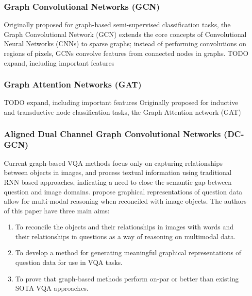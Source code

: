\subsubsection{Graph Convolutional Networks (GCN)}
Originally proposed for graph-based semi-supervised classification tasks, the Graph Convolutional Network (GCN) extends the core concepts of Convolutional Neural Networks (CNNs) to sparse graphs; instead of performing convolutions on regions of pixels, GCNs convolve features from connected nodes in graphs.
{\color{red} TODO expand, including important features}

\noindent

\subsubsection{Graph Attention Networks (GAT)}
{\color{red} TODO expand, including important features}
Originally proposed for inductive and transductive node-classification tasks, the Graph Attention network (GAT)

\subsubsection{Aligned Dual Channel Graph Convolutional Networks (DC-GCN)}

Current graph-based VQA methods focus only on capturing relationships between objects in images, and process textual information using traditional RNN-based approaches, indicating a need to close the semantic gap between question and image domains. \citeauthor{huang2020aligned} propose graphical representations of question data allow for multi-modal reasoning when reconciled with image objects. The authors of this paper have three main aims:

\begin{enumerate}
    \item To reconcile the objects and their relationships in images with words and their relationships in questions as a way of reasoning on multimodal data.
    \item To develop a method for generating meaningful graphical representations of question data for use in VQA tasks.
    \item To prove that graph-based methods perform on-par or better than existing SOTA VQA approaches.
\end{enumerate}

